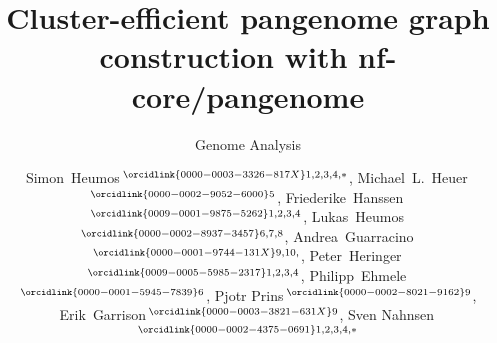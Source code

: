 \documentclass{bioinfo}
\theoremstyle{definition}
\begin{document}

    \subtitle{Genome Analysis}

    \title[Cluster-efficient pangenome graph construction with nf-core/pangenome]{Cluster-efficient pangenome graph construction with nf-core/pangenome}
    
	\author[Heumos \textit{et~al}.]{
        Simon~Heumos\,$^{\orcidlink{0000-0003-3326-817X}1,2,3,4,*}$,
        Michael~L.~Heuer\,$^{\orcidlink{0000-0002-9052-6000}5}$,
        Friederike~Hanssen\,$^{\orcidlink{0009-0001-9875-5262}1,2,3,4}$,
        Lukas~Heumos\,$^{\orcidlink{0000-0002-8937-3457}6,7,8}$,
        Andrea~Guarracino\,$^{\orcidlink{0000-0001-9744-131X}9,10,}$,
        Peter~Heringer\,$^{\orcidlink{0009-0005-5985-2317}1,2,3,4}$,
        Philipp~Ehmele\,$^{\orcidlink{0000-0001-5945-7839}6}$,
        Pjotr Prins\,$^{\orcidlink{0000-0002-8021-9162}9}$,
        Erik~Garrison\,$^{\orcidlink{0000-0003-3821-631X}9}$,
        Sven Nahnsen\,$^{\orcidlink{0000-0002-4375-0691}1,2,3,4,*}$
    }

    \address{
	$^1$Quantitative Biology Center (QBiC) Tübingen, University of Tübingen, Tübingen, Germany \\ 
	$^2$Biomedical Data Science, Dept. of Computer Science, University of Tübingen, Tübingen, Germany \\ 
	$^3$M3 Research Center, University Hospital Tübingen, Tübingen, Germany \\ 
	$^4$Institute for Bioinformatics and Medical Informatics (IBMI), Eberhard-Karls University of Tübingen, Tübingen, Germany \\ 
	$^5$University of California, Berkeley, Berkeley, 94720, California, USA \\
	$^6$Institute of Computational Biology, Department of Computational Health, Helmholtz Munich, Germany \\ 
	$^7$Comprehensive Pneumology Center with the CPC-M bioArchive, Helmholtz Zentrum Munich, Member of the German Center for Lung Research (DZL), Munich, Germany \\ 
	$^8$TUM School of Life Sciences Weihenstephan, Technical University of Munich, Freising, Germany \\
	$^{9}$Department of Genetics, Genomics and Informatics, University of Tennessee Health Science Center, 71 S Manassas St, Memphis, 38163, Tennessee, USA \\ 
	$^{10}$Human Technopole, Viale Rita Levi-Montalcini 1, 20157, Milan, Italy \\
    }
\end{document}
